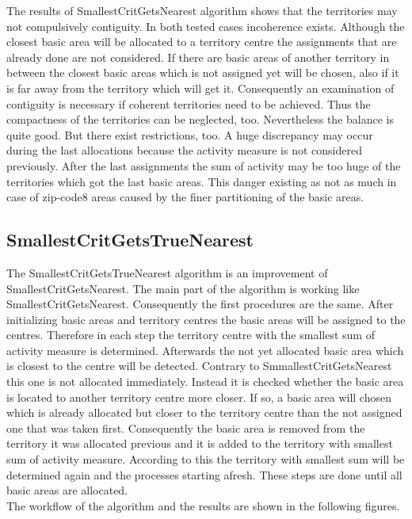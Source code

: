 The results of SmallestCritGetsNearest algorithm shows that the territories may not compulsively contiguity. In both tested cases incoherence exists. Although the closest basic area will be allocated to a territory centre the assignments that are already done are not considered. If there are basic areas of another territory in between the closest basic areas which is not assigned yet will be chosen, also if it is far away from the territory which will get it. Consequently an examination of contiguity is necessary if coherent territories need to be achieved. Thus the compactness of the territories can be neglected, too. Nevertheless the balance is quite good. But there exist restrictions, too. A huge discrepancy may occur during the last allocations because the activity measure is not considered previously. After the last assignments the sum of activity may be too huge of the territories which got the last basic areas. This danger existing as not as much in case of zip-code8 areas caused by the finer partitioning of the basic areas.

\subsection{SmallestCritGetsTrueNearest}

The SmallestCritGetsTrueNearest algorithm is an improvement of SmallestCritGetsNearest. The main part of the algorithm is working like SmallestCritGetsNearest. Consequently the first procedures are the same. After initializing basic areas and territory centres the basic areas will be assigned to the centres. Therefore in each step the territory centre with the smallest sum of activity measure is determined. Afterwards the not yet allocated basic area which is closest to the centre will be detected. Contrary to SmmallestCritGetsNearest this one is not allocated immediately. Instead it is checked whether the basic area is located to another territory centre more closer. If so, a basic area will chosen which is already allocated but closer to the territory centre than the not assigned one that was taken first. Consequently the basic area is removed from the territory it was allocated previous and it is added to the territory with smallest sum of activity measure. According to this the territory with smallest sum will be determined again and the processes starting afresh. These steps are done until all basic areas are allocated.\\
The workflow of the algorithm and the results are shown in the following figures.

